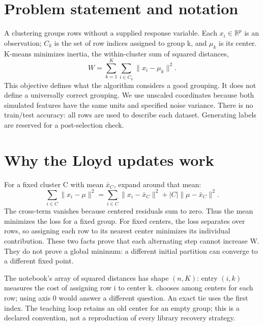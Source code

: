 

\section*{Problem statement and notation}
A clustering groups rows without a supplied response variable. Each $x_i\in\mathbb R^p$ is an observation;
$C_k$ is the set of row indices assigned to group k, and $\mu_k$ is its center.
K-means minimizes inertia, the within-cluster sum of squared distances,
\[W=\sum_{k=1}^K\sum_{i\in C_k}\|x_i-\mu_k\|^2.\]
This objective defines what the algorithm considers a good grouping. It does not define a universally correct grouping.
We use unscaled coordinates because both simulated features have the same units and specified noise variance.
There is no train/test accuracy: all rows are used to describe each dataset. Generating labels are reserved for a post-selection check.

\section{Why the Lloyd updates work}
For a fixed cluster C with mean $\bar x_C$, expand around that mean:
\[
\sum_{i\in C}\|x_i-\mu\|^2
=\sum_{i\in C}\|x_i-\bar x_C\|^2+|C|\|\mu-\bar x_C\|^2.
\]
The cross-term vanishes because centered residuals sum to zero. Thus the mean minimizes the loss for a fixed group.
For fixed centers, the loss separates over rows, so assigning each row to its nearest center minimizes its individual contribution.
These two facts prove that each alternating step cannot increase W. They do not prove a global minimum:
a different initial partition can converge to a different fixed point.

The notebook's array of squared distances has shape $(n,K)$: entry $(i,k)$ measures the cost of assigning row i to center k.
 chooses among centers for each row; using axis 0 would answer a different question.
An exact tie uses the first index. The teaching loop retains an old center for an empty group;
this is a declared convention, not a reproduction of every library recovery strategy.

